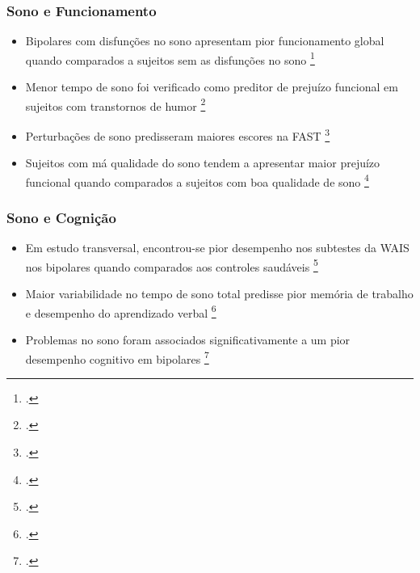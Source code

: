 \documentclass{beamer}
\begin{document}
\begin{frame}
\frametitle{Sono e Funcionamento}

    \begin{itemize}

        \item Bipolares com disfunções no sono apresentam pior funcionamento global
        quando comparados a sujeitos sem as disfunções no sono
        \footcite{giglio_sleep_2009}

        \item Menor tempo de sono foi verificado como preditor de prejuízo funcional
        em sujeitos com transtornos de humor
        \footcite{slyepchenko_association_2019}

        \item Perturbações de sono predisseram maiores escores na FAST
        \footcite{walz_daytime_2013}

        \item Sujeitos com má qualidade do sono tendem a apresentar maior prejuízo
        funcional quando comparados a sujeitos com boa qualidade de sono
            \footcite{lai_familiality_2014}

    \end{itemize}

\end{frame}

\begin{frame}
\frametitle{Sono e Cognição}

    \begin{itemize}

        \item Em estudo transversal, encontrou-se pior desempenho nos subtestes
        da WAIS nos bipolares quando comparados aos controles saudáveis
            \footcite{martinez-aran_cognitive_2004}

        \item Maior variabilidade no tempo de sono total predisse pior memória de
        trabalho e desempenho do aprendizado verbal
        \footcite{kanady_association_2017}

        \item Problemas no sono foram associados significativamente a um pior
        desempenho cognitivo em bipolares
        \footcite{russo_relationship_2015,
        kaplan_sleep_2020}

    \end{itemize}

\end{frame}
\end{document}
